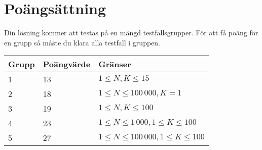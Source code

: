 \section*{Poängsättning}
Din lösning kommer att testas på en mängd testfallsgrupper. För att få poäng för en grupp så måste du klara alla testfall i gruppen.

\begin{tabular}{| l | l | l |}
\hline
Grupp & Poängvärde & Gränser\\ \hline
1     & 13         & $ 1 \le N, K \le 15 $ \\ \hline
2     & 18         & $ 1 \le N \le 100\,000, K = 1 $ \\ \hline
3     & 19         & $ 1 \le N, K \le 100 $ \\ \hline
4     & 23         & $ 1 \le N \le 1\,000, 1 \le K \le 100 $ \\ \hline
5     & 27         & $ 1 \le N \le 100\,000, 1 \le K \le 100 $ \\ \hline
\end{tabular}

